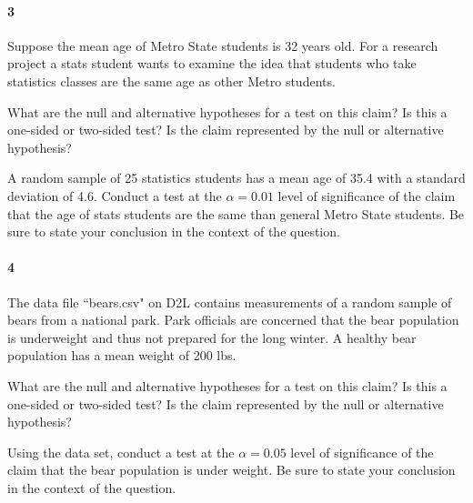\documentclass{article}
\begin{document}
\begin{flushleft}
\newpage
\paragraph{3} Suppose the mean age of Metro State students is 32 years old. For a research project a stats student wants to examine the idea that students who take statistics classes are the same age as other Metro students. 
\begin{enumalpha}
\item What are the null and alternative hypotheses for a test on this claim? Is this a one-sided or two-sided test? Is the claim represented by the null or alternative hypothesis?
\vspace{2.5in}
\item A random sample of 25 statistics students has a mean age of 35.4 with a standard deviation of 4.6. Conduct a test at the $\alpha = 0.01$ level of significance of the claim that the age of stats students are the same than general Metro State students. Be sure to state your conclusion in the context of the question.
\end{enumalpha}

\newpage
\paragraph{4} The data file ``bears.csv" on D2L contains measurements of a random sample of bears from a national park. Park officials are concerned that the bear population is underweight and thus not prepared for the long winter. A healthy bear population has a mean weight of 200 lbs.
\begin{enumalpha}
\item What are the null and alternative hypotheses for a test on this claim? Is this a one-sided or two-sided test? Is the claim represented by the null or alternative hypothesis?
\vspace{2.5in}
\item Using the data set, conduct a test at the $\alpha = 0.05$ level of significance of the claim that the bear population is under weight. Be sure to state your conclusion in the context of the question.
\end{enumalpha}



\end{flushleft}
\end{document}
